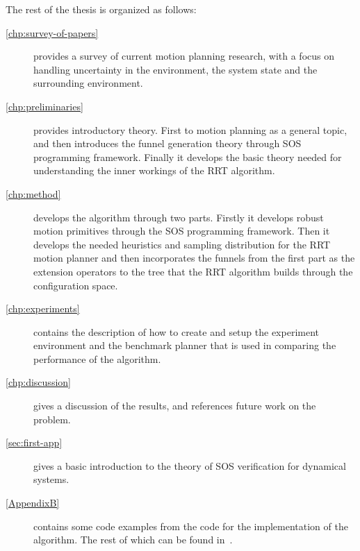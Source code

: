 The rest of the thesis is organized as follows:
\begin{description}

\item[\cref{chp:survey-of-papers}] provides a survey of current motion planning
  research, with a focus on handling uncertainty in the environment, the system
  state and the surrounding environment.    

\item[\cref{chp:preliminaries}] provides introductory theory. First to motion
  planning as a general topic, and then introduces the funnel generation theory
  through \ac{SOS} programming framework. Finally it develops the basic theory
  needed for understanding the inner workings of the \ac{RRT} algorithm.
    
\item[\cref{chp:method}] develops the \rrtfunnel{} algorithm through two parts.
  Firstly it develops robust motion primitives through the \ac{SOS} programming
  framework. Then it develops the needed heuristics and sampling distribution
  for the \ac{RRT} motion planner and then incorporates the funnels from the
  first part as the extension operators to the tree that the \ac{RRT} algorithm
  builds through the configuration space.
    
\item[\cref{chp:experiments}] contains the description of how to create and
  setup the experiment environment and the benchmark planner that is used in
  comparing the performance of the \rrtfunnel{} algorithm.

\item[\cref{chp:discussion}] gives a discussion of the results, and references
  future work on the problem.

\item[\cref{sec:first-app}] gives a basic introduction to the theory of \ac{SOS}
  verification for dynamical systems.

\item[\cref{AppendixB}] contains some code examples from the code for the
  implementation of the \rrtfunnel{} algorithm. The rest of which can be found
  in~\cite{MasterThesisCode2019}.

\end{description}


